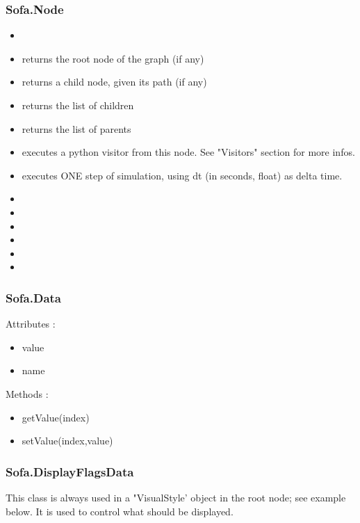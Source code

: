 \subsubsection{Sofa.Node}
\begin{itemize}
\item {} 
\item {} returns the root node of the graph (if any) 
\item {} returns a child node, given its path (if any) 
\item {} returns the list of children 
\item {} returns the list of parents
\item {} executes a python visitor from this node. See "Visitors" section for more infos.
\item {} executes ONE step of simulation, using dt (in seconds, float) as delta time. 
\item {} 
\item {} 
\item {} 
\item {} 
\item {} 
\item {} 
\end{itemize}


\subsubsection{Sofa.Data}
Attributes :
\begin{itemize}
\item value
\item name
\end{itemize}
Methods :
\begin{itemize}
\item getValue(index)
\item setValue(index,value)
\end{itemize}

\subsubsection{Sofa.DisplayFlagsData}

This class is always used in a "VisualStyle' object in the root node; see example below. It is used to control what should be displayed.

